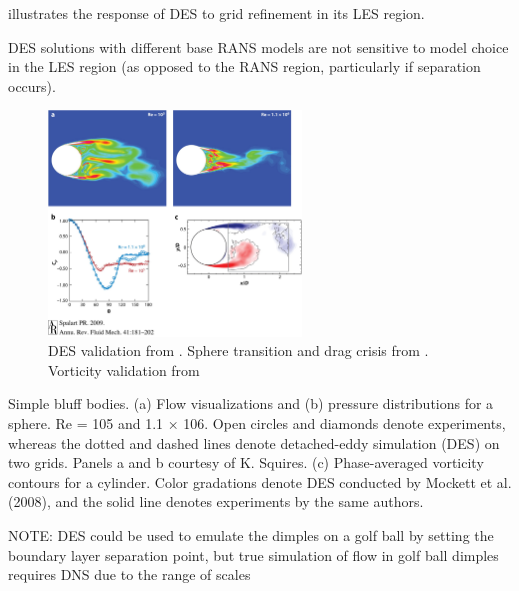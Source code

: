 \documentclass[journal]{new-aiaa}
\begin{document}
illustrates the response of DES to grid refinement in its LES region.

DES solutions with different base RANS models are not sensitive to
model choice in the LES region (as opposed to the RANS region, particularly if separation occurs).





\begin{figure}[H]
\begin{center}
\includegraphics[width=0.6\textwidth]{Images/logan/spalart2009detachededdy_SphereSeparation.jpeg}
\caption{ DES validation from \cite{spalart2009detachededdy}. Sphere transition and drag crisis from \cite{squires2004detachededdy}.  Vorticity validation from \cite{mockett2008demonstration} }
\label{fig:desspherevalidation}
\end{center}
\end{figure}

Simple bluff bodies. (a) Flow visualizations and (b) pressure distributions for a sphere. Re = 105 and 1.1 × 106. Open circles and
diamonds denote experiments, whereas the dotted and dashed lines denote detached-eddy simulation (DES) on two grids. Panels a and
b courtesy of K. Squires. (c) Phase-averaged vorticity contours for a cylinder. Color gradations denote DES conducted by Mockett et al.
(2008), and the solid line denotes experiments by the same authors.

NOTE: DES could be used to emulate the dimples on a golf ball by setting the boundary layer separation point, but true simulation of flow in golf ball dimples requires DNS due to the range of scales
\end{document}
